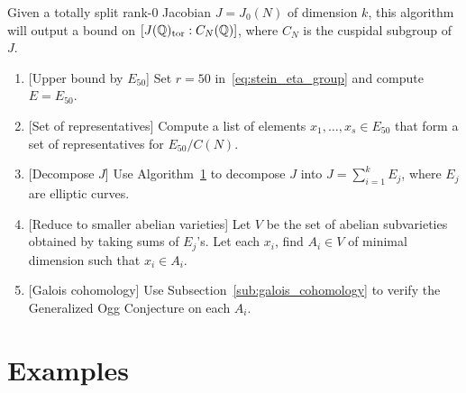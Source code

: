 \begin{algorithm}%
    Given a totally split rank-0 Jacobian $J=J_0(N)$ of dimension $k$, this
    algorithm will output a bound on $[J(\mathbb{Q})_{\mathrm{tor}}:C_N(\mathbb{Q})]$, where $C_N$ is
    the cuspidal subgroup of $J$.
    \begin{enumerate}
        \item{} [Upper bound by $E_{50}$]
            Set $r=50$ in~\eqref{eq:stein_eta_group} and compute $E=E_{50}$.
        \item{} [Set of representatives]
            Compute a list of elements $x_1,\ldots,x_s\in E_{50}$ that form a
            set of representatives for $E_{50}/C(N)$.
        \item{} [Decompose $J$]
            Use Algorithm~\ref{} to decompose $J$ into $J=\sum_{i=1} ^k E_j$,
            where $E_j$ are elliptic curves. 
        \item{} [Reduce to smaller abelian varieties]
            Let $V$ be the set of abelian subvarieties obtained by taking sums
            of $E_j$'s. Let each $x_i$, find $A_i\in V$ of minimal dimension
            such that $x_i\in A_i$.
        \item{} [Galois cohomology]
            Use Subsection~\ref{sub:galois_cohomology} to verify the
            Generalized Ogg Conjecture on each $A_i$.
    \end{enumerate}
\end{algorithm}

\section{Examples}


